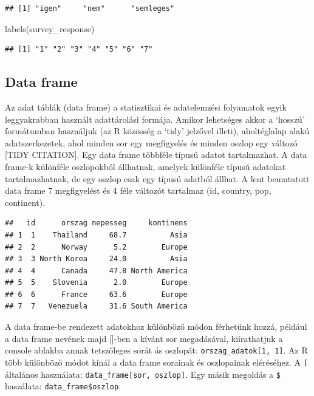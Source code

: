 \documentclass[
]{book}
\newenvironment{Shaded}{\begin{snugshade}}{\end{snugshade}}
\newcommand{\FunctionTok}[1]{\textcolor[rgb]{0.00,0.00,0.00}{#1}}
\newcommand{\NormalTok}[1]{#1}
\begin{document}
\begin{verbatim}
## [1] "igen"     "nem"      "semleges"
\end{verbatim}

\begin{Shaded}
\begin{Highlighting}[]
\FunctionTok{labels}\NormalTok{(survey\_response)}
\end{Highlighting}
\end{Shaded}

\begin{verbatim}
## [1] "1" "2" "3" "4" "5" "6" "7"
\end{verbatim}

\hypertarget{data-frame}{%
\subsection{Data frame}\label{data-frame}}

Az adat táblák (data frame) a statisztikai és adatelemzési folyamatok
egyik leggyakrabban használt adattárolási formája. Amikor lehetséges
akkor a `hosszú' formátumban használjuk (az R közösség a `tidy' jelzővel
illeti), aholtéglalap alakú adatszerkezetek, ahol minden sor egy
megfigyelés és minden oszlop egy változó {[}TIDY CITATION{]}. Egy data
frame többféle típusú adatot tartalmazhat. A data frame-k különféle
oszlopokból állhatnak, amelyek különféle típusú adatokat
tartalmazhatnak, de egy oszlop csak egy típusú adatból állhat. A lent
bemutatott data frame 7 megfigyelést és 4 féle változót tartalmaz (id,
country, pop, continent).

\begin{verbatim}
##   id      orszag nepesseg     kontinens
## 1  1    Thailand     68.7          Asia
## 2  2      Norway      5.2        Europe
## 3  3 North Korea     24.0          Asia
## 4  4      Canada     47.8 North America
## 5  5    Slovenia      2.0        Europe
## 6  6      France     63.6        Europe
## 7  7   Venezuela     31.6 South America
\end{verbatim}

A data frame-be rendezett adatokhoz különböző módon férhetünk hozzá,
például a data frame nevének majd {[}{]}-ben a kívánt sor megadásával,
kiírathatjuk a console ablakba annak tetszőleges sorát ás oszlopát:
\texttt{orszag\_adatok{[}1,\ 1{]}}. Az R több különböző módot kínál a
data frame sorainak és oszlopainak eléréséhez. A \texttt{{[}} általános
használata: \texttt{data\_frame{[}sor,\ oszlop{]}}. Egy másik megoldás a
\texttt{\$} haszálata: \texttt{data\_frame\$oszlop}.
\end{document}
